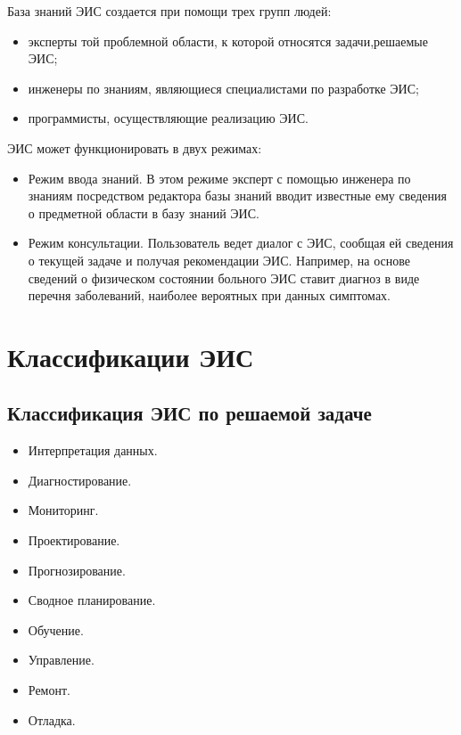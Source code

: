 \documentclass[a4paper,12pt,notitlepage,pdftex,headsepline]{scrartcl}
\begin{document}
  База знаний ЭИС создается при помощи трех групп людей:
  \begin{itemize}
    \item эксперты той проблемной области, к которой относятся задачи,решаемые
      ЭИС;
    \item инженеры по знаниям, являющиеся специалистами по разработке ЭИС;
    \item программисты, осуществляющие реализацию ЭИС.
  \end{itemize}

  ЭИС может функционировать в двух режимах:
  \begin{itemize}
    \item Режим ввода знаний.
      В этом режиме эксперт с помощью инженера по знаниям посредством
      редактора базы знаний вводит известные ему сведения о предметной области
      в базу знаний ЭИС.
    \item Режим консультации.
      Пользователь ведет диалог с ЭИС, сообщая ей сведения о текущей задаче и
      получая рекомендации ЭИС.
      Например, на основе сведений о физическом состоянии больного ЭИС ставит
      диагноз в виде перечня заболеваний, наиболее вероятных при данных
      симптомах.
  \end{itemize}
  \clearpage

\section{Классификации ЭИС}
  \subsection{Классификация ЭИС по решаемой задаче}
    \begin{itemize}
      \item Интерпретация данных.
      \item Диагностирование.
      \item Мониторинг.
      \item Проектирование.
      \item Прогнозирование.
      \item Сводное планирование.
      \item Обучение.
      \item Управление.
      \item Ремонт.
      \item Отладка.
    \end{itemize}
\end{document}
